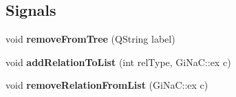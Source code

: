 \subsection*{Signals}
\begin{DoxyCompactItemize}
\item 
\mbox{\label{classgraphic_cycle_a6d2dcfcc8cebd335554acde542ddc39e}} 
void {\bfseries remove\+From\+Tree} (Q\+String label)
\item 
\mbox{\label{classgraphic_cycle_a6231889023dfe5d4dae8575ed28e8208}} 
void {\bfseries add\+Relation\+To\+List} (int rel\+Type, Gi\+Na\+C\+::ex c)
\item 
\mbox{\label{classgraphic_cycle_a2a8df8cc7ffa73b622ac076c8fe3daf8}} 
void {\bfseries remove\+Relation\+From\+List} (Gi\+Na\+C\+::ex c)
\end{DoxyCompactItemize}

